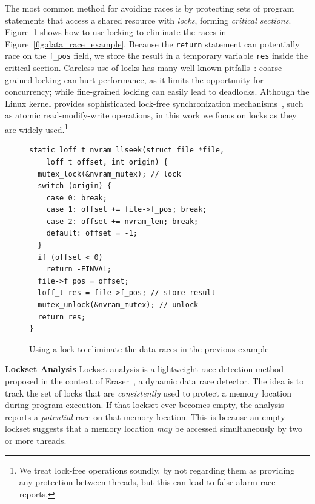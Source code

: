 The most common method for avoiding races is by protecting sets of program statements that access a shared resource with \emph{locks}, forming \emph{critical sections}.  Figure~\ref{fig:lock_example} shows how to use locking to eliminate the races in Figure~\ref{fig:data_race_example}. Because the \texttt{return} statement can potentially race on the \texttt{f\_pos} field, we store the result in a temporary variable \texttt{res} inside the critical section.
%
Careless use of locks has many well-known pitfalls~\cite{sutter2005software}: coarse-grained locking can hurt performance, as it limits the opportunity for concurrency; while fine-grained locking can easily lead to deadlocks. Although the Linux kernel provides sophisticated lock-free synchronization mechanisms~\cite[p.\ 123]{corbet2005linux}, such as atomic read-modify-write operations, in this work we focus on locks as they are widely used.\footnote{We treat lock-free operations soundly, by not regarding them as providing any protection between threads, but this can lead to false alarm race reports.}

\begin{figure}[t]
\begin{lstlisting}
static loff_t nvram_llseek(struct file *file,
    loff_t offset, int origin) {
  mutex_lock(&nvram_mutex); // lock
  switch (origin) {
    case 0: break;
    case 1: offset += file->f_pos; break;
    case 2: offset += nvram_len; break;
    default: offset = -1;
  }
  if (offset < 0)
    return -EINVAL;
  file->f_pos = offset;
  loff_t res = file->f_pos; // store result
  mutex_unlock(&nvram_mutex); // unlock
  return res;
}
\end{lstlisting}
\vspace{-2mm}
\caption{Using a lock to eliminate the data races in the previous example}
\label{fig:lock_example}
\vspace{-2mm}
\end{figure}

\noindent\textbf{Lockset Analysis }
%
Lockset analysis is a lightweight race detection method proposed in the context of Eraser~\cite{savage1997eraser}, a dynamic data race detector.  The idea is to track the set of locks that are \emph{consistently} used to protect a memory location during program execution. If that lockset ever becomes empty, the analysis reports a \emph{potential} race on that memory location. This is because an empty lockset suggests that a memory location \emph{may} be accessed simultaneously by two or more threads.  

